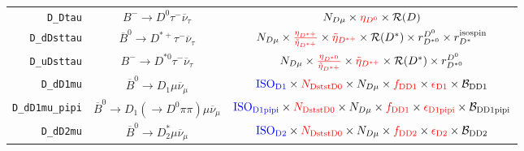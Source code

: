 \begin{landscape}
\begin{table}
\begin{tabular}{r|c|c}
         \texttt{D\_Dtau} &                   $B^- \rightarrow D^0 \tau^- \overline{\nu}_\tau$                   &                                                                                                                                                $N_{D \mu} \times \textcolor{red}{\eta_{D^0}} \times \mathcal{R}(D)$                                                                                                                                                 \\
      \texttt{D\_dDsttau} &            $\overline{B}^0 \rightarrow D^{*+} \tau^- \overline{\nu}_\tau$            &                                                                             $N_{D \mu} \times \textcolor{red}{\frac{\eta_{D^{*+}}}{\tilde{\eta}_{D^{*+}}}} \times \textcolor{red}{\tilde{\eta}_{D^{*+}}} \times \mathcal{R}(D^*) \times r_{D^{*0}}^{D^0} \times r_{D^*}^\text{isospin}$                                                                             \\
      \texttt{D\_uDsttau} &                 $B^- \rightarrow D^{*0} \tau^- \overline{\nu}_\tau$                  &                                                                                            $N_{D \mu} \times \textcolor{red}{\frac{\eta_{D^{*0}}}{\tilde{\eta}_{D^{*+}}}} \times \textcolor{red}{\tilde{\eta}_{D^{*+}}} \times \mathcal{R}(D^*) \times r_{D^{*0}}^{D^0}$                                                                                            \\
        \texttt{D\_dD1mu} &               $\overline{B}^0 \rightarrow D_1 \mu \overline{\nu}_\mu$                &                                                                          $\textcolor{blue}{\text{ISO}_\text{D1}} \times \textcolor{red}{N_\text{DststD0}} \times N_{D \mu} \times \textcolor{red}{f_\text{DD1}} \times \textcolor{red}{\epsilon_\text{D1}} \times \mathcal{B}_\text{DD1}$                                                                           \\
  \texttt{D\_dD1mu\_pipi} &   $\overline{B}^0 \rightarrow D_1 (\rightarrow D^0 \pi\pi) \mu \overline{\nu}_\mu$   &                                                                    $\textcolor{blue}{\text{ISO}_\text{D1pipi}} \times \textcolor{red}{N_\text{DststD0}} \times N_{D \mu} \times \textcolor{red}{f_\text{DD1}} \times \textcolor{red}{\epsilon_\text{D1pipi}} \times \mathcal{B}_\text{DD1pipi}$                                                                     \\
        \texttt{D\_dD2mu} &              $\overline{B}^0 \rightarrow D^*_2 \mu \overline{\nu}_\mu$               &                                                                          $\textcolor{blue}{\text{ISO}_\text{D2}} \times \textcolor{red}{N_\text{DststD0}} \times N_{D \mu} \times \textcolor{red}{f_\text{DD2}} \times \textcolor{red}{\epsilon_\text{D2}} \times \mathcal{B}_\text{DD2}$                                                                           \\

\end{tabular}
\end{table}
\end{landscape}
